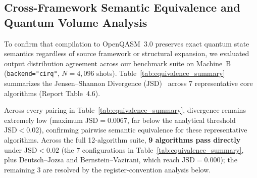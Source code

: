 \documentclass[runningheads]{llncs}
\begin{document}
\subsection{Cross-Framework Semantic Equivalence and Quantum Volume Analysis}

To confirm that compilation to OpenQASM~3.0 preserves exact quantum state semantics regardless of source framework or structural expansion, we evaluated output distribution agreement across our benchmark suite on Machine~B (\texttt{backend="cirq"}, $N=4,096$ shots). Table~\ref{tab:equivalence_summary} summarizes the Jensen--Shannon Divergence ($\text{JSD}$)~\cite{lin1991} across 7 representative core algorithms (Report Table~4.6).

\begin{table}[htbp]
\centering
\caption{Pairwise Jensen--Shannon Divergence across 7 representative algorithm configurations at $N=4,096$ shots on Machine~B (Report Table~4.6). Columns give the three framework pairings; all fall below the threshold $\text{JSD} < 0.02$.}
\label{tab:equivalence_summary}
\renewcommand{\arraystretch}{1.15}
\setlength{\tabcolsep}{10pt}
\end{table}

Across every pairing in Table~\ref{tab:equivalence_summary}, divergence remains extremely low (maximum $\text{JSD} = 0.0067$, far below the analytical threshold $\text{JSD} < 0.02$), confirming pairwise semantic equivalence for these representative algorithms. Across the full 12-algorithm suite, \textbf{9 algorithms pass directly} under $\text{JSD} < 0.02$ (the 7 configurations in Table~\ref{tab:equivalence_summary}, plus Deutsch--Jozsa and Bernstein--Vazirani, which reach $\text{JSD} = 0.000$); the remaining 3 are resolved by the register-convention analysis below.
\end{document}
